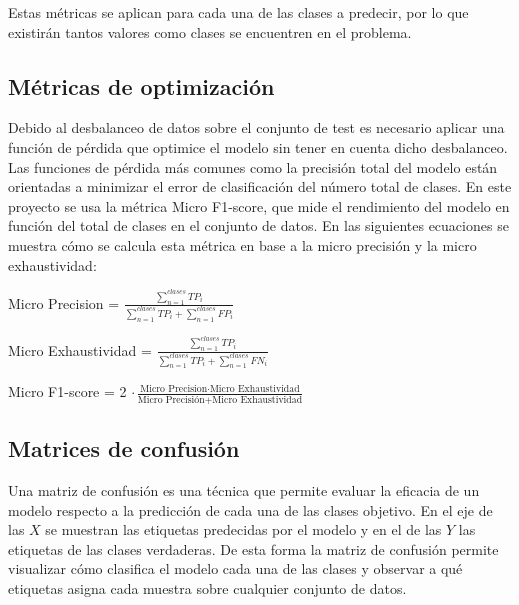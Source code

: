         Estas métricas se aplican para cada una de las clases a predecir, por lo que existirán tantos valores como clases se encuentren en el problema.

        \subsection{Métricas de optimización}

            Debido al desbalanceo de datos sobre el conjunto de test es necesario aplicar una función de pérdida que optimice el modelo sin tener en cuenta dicho desbalanceo. Las funciones de pérdida más comunes como la precisión total del modelo están orientadas a minimizar el error de clasificación del número total de clases. En este proyecto se usa la métrica Micro F1-score, que mide el rendimiento del modelo en función del total de clases en el conjunto de datos. En las siguientes ecuaciones se muestra cómo se calcula esta métrica en base a la micro precisión y la micro exhaustividad:

                \begin{center}
                    Micro Precision =  $\frac{ \sum_{n=1} ^ {clases} TP_i} {\sum_{n = 1} ^ {clases} TP_i + \sum_{n = 1} ^ {clases} FP_i}$
                \end{center}

                \begin{center}
                    Micro Exhaustividad = $\frac{ \sum_{n=1} ^ {clases} TP_i} {\sum_{n = 1} ^ {clases} TP_i + \sum_{n = 1} ^ {clases} FN_i}$
                \end{center}

                \begin{center}
                    Micro F1-score =  2 $\cdot \frac{\text{Micro Precision} \cdot \text{Micro Exhaustividad}} {\text{Micro Precisión} + \text{Micro Exhaustividad}}$
                \end{center}

        \subsection{Matrices de confusión}

        Una matriz de confusión es una técnica que permite evaluar la eficacia de un modelo respecto a la predicción de cada una de las clases objetivo. En el eje de las $X$ se muestran las etiquetas predecidas por el modelo y en el de las $Y$ las etiquetas de las clases verdaderas. De esta forma la matriz de confusión permite visualizar cómo clasifica el modelo cada una de las clases y observar a qué etiquetas asigna cada muestra sobre cualquier conjunto de datos.\\

